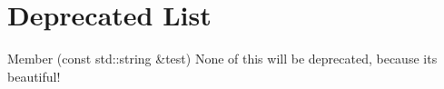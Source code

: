 \chapter{Deprecated List}
\hypertarget{deprecated}{}\label{deprecated}

\begin{DoxyRefList}
\item[Member \doxylink{class_my_library_1_1_example_a1c0046b0674eb4cad09c5d3e943912b8}{My\+Library\+::Example\+::test} (const std\+::string \&test)]\label{deprecated__deprecated000001}%
%
None of this will be deprecated, because it\textquotesingle{}s beautiful!
\end{DoxyRefList}